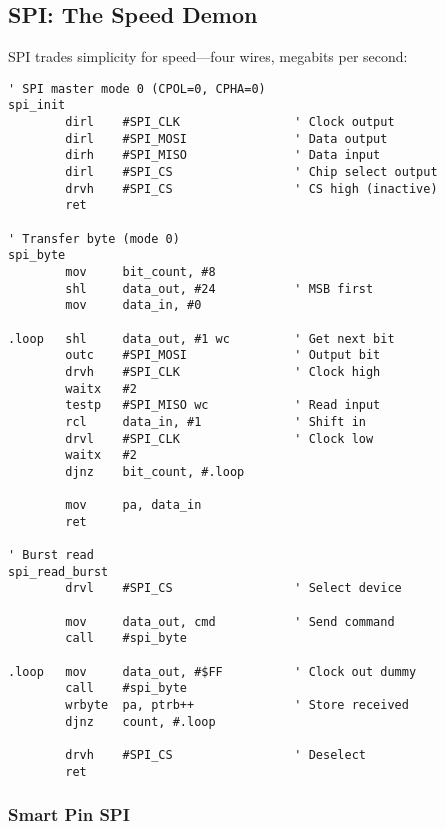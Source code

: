 \documentclass[11pt]{book}
\begin{document}
\hypertarget{spi-the-speed-demon}{%
\subsection{SPI: The Speed Demon}\label{spi-the-speed-demon}}

SPI trades simplicity for speed---four wires, megabits per second:

\begin{lstlisting}
' SPI master mode 0 (CPOL=0, CPHA=0)
spi_init
        dirl    #SPI_CLK                ' Clock output
        dirl    #SPI_MOSI               ' Data output
        dirh    #SPI_MISO               ' Data input
        dirl    #SPI_CS                 ' Chip select output
        drvh    #SPI_CS                 ' CS high (inactive)
        ret

' Transfer byte (mode 0)
spi_byte
        mov     bit_count, #8
        shl     data_out, #24           ' MSB first
        mov     data_in, #0
        
.loop   shl     data_out, #1 wc         ' Get next bit
        outc    #SPI_MOSI               ' Output bit
        drvh    #SPI_CLK                ' Clock high
        waitx   #2
        testp   #SPI_MISO wc            ' Read input
        rcl     data_in, #1             ' Shift in
        drvl    #SPI_CLK                ' Clock low
        waitx   #2
        djnz    bit_count, #.loop
        
        mov     pa, data_in
        ret

' Burst read
spi_read_burst
        drvl    #SPI_CS                 ' Select device
        
        mov     data_out, cmd           ' Send command
        call    #spi_byte
        
.loop   mov     data_out, #$FF          ' Clock out dummy
        call    #spi_byte
        wrbyte  pa, ptrb++              ' Store received
        djnz    count, #.loop
        
        drvh    #SPI_CS                 ' Deselect
        ret
\end{lstlisting}

\hypertarget{smart-pin-spi}{%
\subsubsection{Smart Pin SPI}\label{smart-pin-spi}}
\end{document}
